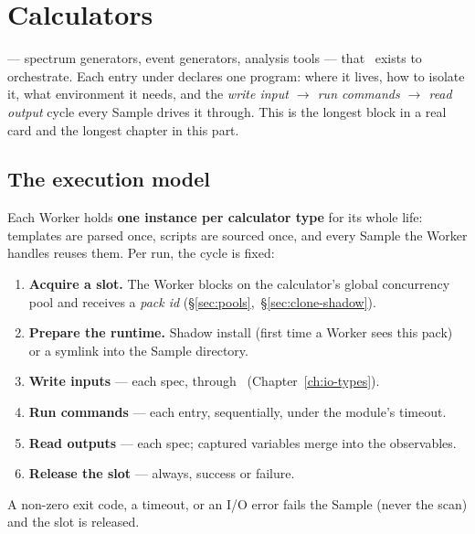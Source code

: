 \chapter{Calculators}
\label{ch:calculators}

 --- spectrum generators, event
generators, analysis tools --- that \Jtwo\ exists to orchestrate. Each entry under
 declares one program: where it lives, how to isolate it,
what environment it needs, and the \emph{write input $\rightarrow$ run commands
$\rightarrow$ read output} cycle every Sample drives it through. This is the longest
block in a real card and the longest chapter in this part.

\section{The execution model}
\label{sec:calc-model}

Each Worker holds \textbf{one instance per calculator type} for its whole life:
templates are parsed once,  scripts are sourced once, and every
Sample the Worker handles reuses them. Per run, the cycle is fixed:

\begin{enumerate}
  \item \textbf{Acquire a slot.} The Worker blocks on the calculator's global
        concurrency pool and receives a \emph{pack id}
        (\S\ref{sec:pools},~\S\ref{sec:clone-shadow}).
  \item \textbf{Prepare the runtime.} Shadow install (first time a Worker sees this
        pack) or a symlink into the Sample directory.
  \item \textbf{Write inputs} --- each  spec, through \Portal\
        (Chapter~\ref{ch:io-types}).
  \item \textbf{Run commands} --- each  entry, sequentially,
        under the module's timeout.
  \item \textbf{Read outputs} --- each  spec; captured
        variables merge into the observables.
  \item \textbf{Release the slot} --- always, success or failure.
\end{enumerate}

A non-zero exit code, a timeout, or an I/O error fails the Sample (never the scan) and
the slot is released.

